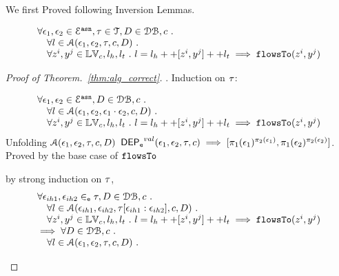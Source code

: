 \documentclass[a4paper,11pt]{article}
\begin{document}
We first Proved following Inversion Lemmas.

\clearpage

\begin{thm}[Correctness]
\label{thm:alg_correct}
\[
\begin{array}{l}
  \forall \mathtt{\epsilon}_1, \mathtt{\epsilon}_2 \in \mathcal{E}^{\mathtt{{asn}}}, \mathtt{\tau} \in \mathcal{T}, D \in \mathcal{DB} , c ~.~
  \\ \quad 
   \forall l \in \mathcal{A}(\mathtt{\epsilon}_1, \mathtt{\epsilon}_2, \mathtt{\tau}, c, D) ~.~
   \\ \quad 
   \forall z^i, y^j \in \mathbb{LV}_c, l_h, l_t ~.~ 
   l = l_h ++ [z^i, y^j] ++ l_t 
   \implies \mathtt{flowsTo}(z^i, y^j)
\end{array}
\]
\end{thm}

\begin{proof}[Proof of Theorem.~\ref{thm:alg_correct}].
Induction on $\mathtt{\tau}$:
\begin{case}
[$\trace = \event_1 \cdot \event_2$]
\[
\begin{array}{l}
  \forall \mathtt{\epsilon}_1, \mathtt{\epsilon}_2 \in \mathcal{E}^{\mathtt{{asn}}}, D \in \mathcal{DB} , c ~.~
  \\ \quad 
   \forall l \in \mathcal{A}( \mathtt{\epsilon}_1, \mathtt{\epsilon}_2,  \mathtt{\epsilon}_1 \cdot \mathtt{\epsilon}_2, c, D) ~.~
   \\ \quad 
   \forall z^i, y^j \in \mathbb{LV}_c, l_h, l_t ~.~ 
   l = l_h ++ [z^i, y^j] ++ l_t 
   \implies \mathtt{flowsTo}(z^i, y^j)
\end{array}
\]
%
Unfolding $\mathcal{A}(\mathtt{\epsilon}_1, \mathtt{\epsilon}_2, \mathtt{\tau}, c, D)$
$\mathsf{DEP_{\mathtt{e}}}^{val}(\mathtt{\epsilon}_1, \mathtt{\epsilon}_2, \mathtt{\tau}, c) \implies [\pi_1(\mathtt{\epsilon}_1)^{\pi_2(\mathtt{\epsilon}_1)}, \pi_1(\mathtt{\epsilon}_2)^{\pi_2(\mathtt{\epsilon}_2)}]$.
\\
Proved by the base case of $\mathtt{flowsTo}$
\end{case}
%
\begin{case}
[$\trace = \event_1 \tracecat \trace_{ih} \cdot \event_2$]
by strong induction on $\mathtt{\tau}$,
\[
\begin{array}{l}
  \forall \mathtt{\epsilon}_{ih1}, \mathtt{\epsilon}_{ih2} \in_{\mathtt{e}} \mathtt{\tau}, D \in \mathcal{DB} , c ~.~
  \\ \quad 
   \forall l \in \mathcal{A}(\mathtt{\epsilon}_{ih1}, \mathtt{\epsilon}_{ih2}, \mathtt{\tau}[\mathtt{\epsilon}_{ih1}:\mathtt{\epsilon}_{ih2}], c, D) ~.~
   \\ \quad 
   \forall z^i, y^j \in \mathbb{LV}_c, l_h, l_t ~.~ 
   l = l_h ++ [z^i, y^j] ++ l_t 
   \implies \mathtt{flowsTo}(z^i, y^j)
   \\
   \implies
   \forall D \in \mathcal{DB} , c ~.~
  \\ \quad 
   \forall l \in \mathcal{A}(\mathtt{\epsilon}_1, \mathtt{\epsilon}_2, \mathtt{\tau}, c, D) ~.~

\end{array}\]
\end{case}
\end{proof}
\end{document}
